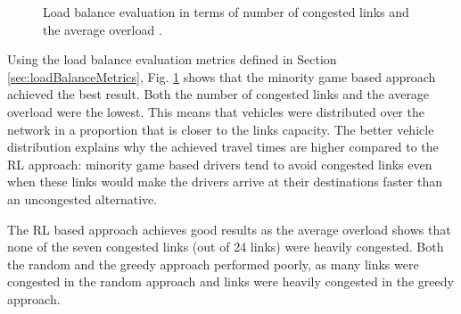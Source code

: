 \documentclass{RITA}
\begin{document}
\begin{figure}[ht]
  \centering
  \caption{Load balance evaluation in terms of number of congested links  and the average overload .}
  \label{fig:loadBalance}
\end{figure}




Using the load balance evaluation metrics defined in Section \ref{sec:loadBalanceMetrics}, Fig. \ref{fig:loadBalance} shows that the minority game based approach achieved the best result. Both the number of congested links and the average overload were the lowest. This means that vehicles were distributed over the network in a proportion that is closer to the links capacity. The better vehicle distribution explains why the achieved travel times are higher compared to the RL approach: minority game based drivers tend to avoid congested links even when these links would make the drivers arrive at their destinations faster than an uncongested alternative. 

The RL based approach achieves good results as the average overload shows that none of the seven congested links (out of 24 links) were heavily congested. Both the random and the greedy approach performed poorly, as many links were congested in the random approach and links were heavily congested in the greedy approach.
\end{document}
